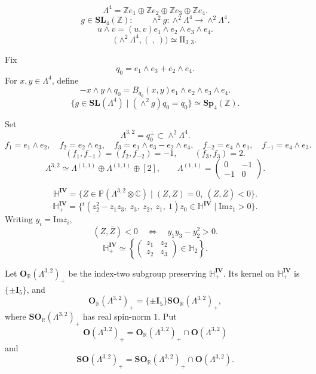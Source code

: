 \documentclass[11pt]{memoir}
\newcommand{\Imag}{\mathrm{Im}}
\newcommand{\Proj}{\mathbb{P}}
\newcommand{\Z}{\mathbb{Z}} \newcommand{\C}{\mathbb{C}}
\newcommand{\R}{\mathbb{R}} \newcommand{\La}{\Lambda}
\newcommand{\HypPlan}{\Lambda^{(1,1)}}
\newcommand{\Sp}{\mathbf{Sp}}
\newcommand{\SL}{\mathbf{SL}}
\newcommand{\Orth}{\mathbf{O}}
\newcommand{\SO}{\mathbf{SO}}
\newcommand{\Hpl}{\mathbb{H}}
\newcommand{\IV}{\mathbf{IV}}
\newcommand{\Id}{\mathbf{I}}
\begin{document}
$$\La^4=\Z e_1\oplus\Z e_2\oplus\Z e_3\oplus\Z e_4.$$
$$g\in\SL_4(\Z):\qquad
\wedge^2g:\wedge^2\La^4\longrightarrow\wedge^2\La^4.$$
$$u\wedge v=(u,v)e_1\wedge e_2\wedge e_3\wedge e_4.$$
$$\bigl(\wedge^2\La^4,(\ ,\ )\bigr)\simeq \mathrm{II}_{3,3}.$$

Fix
$$q_0=e_1\wedge e_3+e_2\wedge e_4.$$
For $x,y\in\La^4$, define
$$-x\wedge y\wedge q_0
=B_{q_0}(x,y)e_1\wedge e_2\wedge e_3\wedge e_4.$$
$$\{g\in \SL(\La^4)\mid(\wedge^2g)q_0=q_0\}\simeq\Sp_4(\Z).$$

Set
$$\La^{3,2}=q_0^\perp\subset\wedge^2\La^4.$$
$$
f_1=e_1\wedge e_2,\quad
f_2=e_2\wedge e_3,\quad
f_3=e_1\wedge e_3-e_2\wedge e_4,\quad
f_{-2}=e_4\wedge e_1,\quad
f_{-1}=e_4\wedge e_3.
$$
$$(f_1,f_{-1})=(f_2,f_{-2})=-1,\qquad (f_3,f_3)=2.$$
$$\La^{3,2}\simeq\HypPlan\oplus\HypPlan\oplus[2],\qquad
\HypPlan=\begin{pmatrix}0&-1\\-1&0\end{pmatrix}.$$

$$\Hpl^{\IV}=
\{Z\in\Proj(\La^{3,2}\otimes\C)\mid (Z,Z)=0,\ (Z,\overline Z)<0\}.$$
$$\Hpl_+^{\IV}=
\{{}^t(z_2^2-z_1z_3,\ z_3,\ z_2,\ z_1,\ 1)z_0\in\Hpl^{\IV}
\mid \Imag z_1>0\}.$$
Writing $y_i=\Imag z_i$,
$$ (Z,\overline Z)<0\quad\Longleftrightarrow\quad y_1y_3-y_2^2>0.$$
$$\Hpl_+^{\IV}\simeq
\left\{\begin{pmatrix}z_1&z_2\\z_2&z_3\end{pmatrix}\in\Hpl_2\right\}.$$

Let $\Orth_{\R}(\La^{3,2})_+$ be the index-two subgroup preserving
$\Hpl_+^{\IV}$.  Its kernel on $\Hpl_+^{\IV}$ is $\{\pm\Id_5\}$, and
$$\Orth_{\R}(\La^{3,2})_+=\{\pm\Id_5\}\SO_{\R}(\La^{3,2})_+,$$
where $\SO_{\R}(\La^{3,2})_+$ has real spin-norm $1$.  Put
$$\Orth(\La^{3,2})_+ = \Orth_{\R}(\La^{3,2})_+ \cap \Orth(\La^{3,2})$$
and
$$\SO(\La^{3,2})_+=\SO_{\R}(\La^{3,2})_+\cap\Orth(\La^{3,2}).$$
\end{document}
